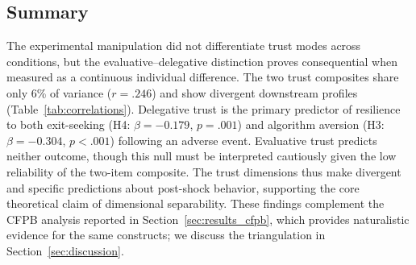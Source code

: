 \subsection{Summary}

The experimental manipulation did not differentiate trust modes across conditions, but the evaluative--delegative distinction proves consequential when measured as a continuous individual difference. The two trust composites share only 6\% of variance ($r = .246$) and show divergent downstream profiles (Table~\ref{tab:correlations}). Delegative trust is the primary predictor of resilience to both exit-seeking (H4: $\beta = -0.179$, $p = .001$) and algorithm aversion (H3: $\beta = -0.304$, $p < .001$) following an adverse event. Evaluative trust predicts neither outcome, though this null must be interpreted cautiously given the low reliability of the two-item composite. The trust dimensions thus make divergent and specific predictions about post-shock behavior, supporting the core theoretical claim of dimensional separability. These findings complement the CFPB analysis reported in Section~\ref{sec:results_cfpb}, which provides naturalistic evidence for the same constructs; we discuss the triangulation in Section~\ref{sec:discussion}.
